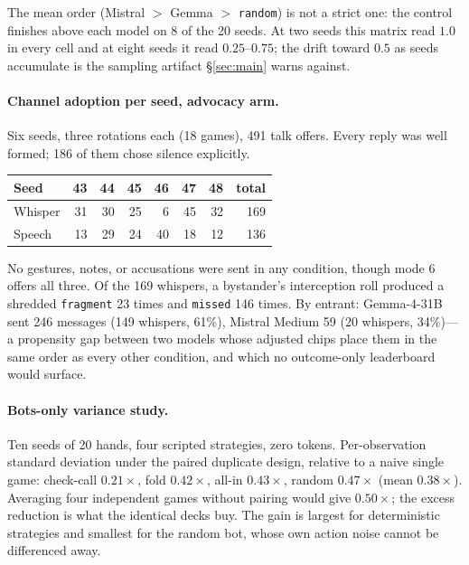 \documentclass{article}
\begin{document}
\noindent The mean order (Mistral $>$ Gemma $>$ \texttt{random}) is not a
strict one: the control finishes above each model on 8 of the 20 seeds. At
two seeds this matrix read $1.0$ in every cell and at eight seeds it read
$0.25$--$0.75$; the drift toward $0.5$ as seeds accumulate is the sampling
artifact \S\ref{sec:main} warns against.

\paragraph{Channel adoption per seed, advocacy arm.} Six seeds, three
rotations each (18 games), 491 talk offers. Every reply was well formed;
186 of them chose silence explicitly.

\begin{center}
\small
\begin{tabular}{lrrrrrrr}
\toprule
Seed & 43 & 44 & 45 & 46 & 47 & 48 & total \\
\midrule
Whisper & 31 & 30 & 25 & 6  & 45 & 32 & 169 \\
Speech  & 13 & 29 & 24 & 40 & 18 & 12 & 136 \\
\bottomrule
\end{tabular}
\end{center}

\noindent No gestures, notes, or accusations were sent in any condition,
though mode 6 offers all three. Of the 169 whispers, a bystander's
interception roll produced a shredded \texttt{fragment} 23 times and
\texttt{missed} 146 times. By entrant: Gemma-4-31B sent 246 messages (149
whispers, 61\%), Mistral Medium 59 (20 whispers, 34\%)---a propensity gap
between two models whose adjusted chips place them in the same order as
every other condition, and which no outcome-only leaderboard would surface.

\paragraph{Bots-only variance study.} Ten seeds of 20 hands, four scripted
strategies, zero tokens. Per-observation standard deviation under the
paired duplicate design, relative to a naive single game: check-call
$0.21\times$, fold $0.42\times$, all-in $0.43\times$, random $0.47\times$
(mean $0.38\times$). Averaging four independent games without pairing
would give $0.50\times$; the excess reduction is what the identical decks
buy. The gain is largest for deterministic strategies and smallest for the
random bot, whose own action noise cannot be differenced away.
\end{document}
